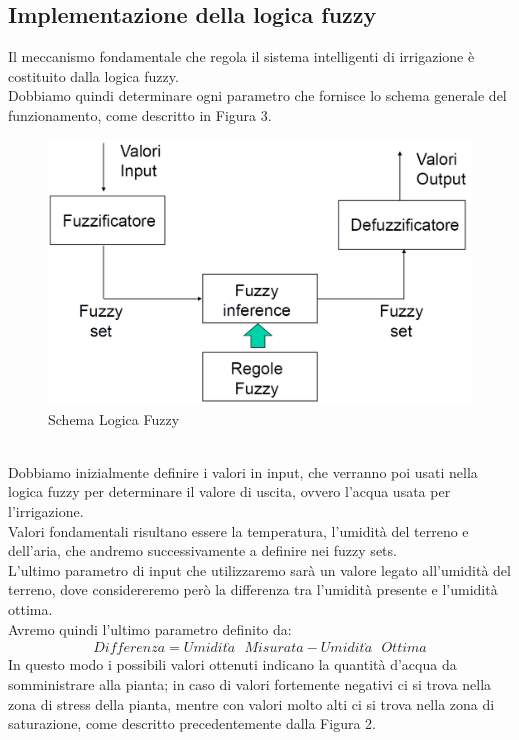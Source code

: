 \documentclass[conference,10pt]{IEEEtran}
\begin{document}
\subsection{Implementazione della logica fuzzy}\label{sec:symo}
Il meccanismo fondamentale che regola il sistema intelligenti di irrigazione è costituito dalla logica fuzzy.\\
Dobbiamo quindi determinare ogni parametro che fornisce lo schema generale del funzionamento, come descritto in Figura 3.
\begin{figure}[ht]
	\centering
	\includegraphics[width=0.8\linewidth]{images/schemafuzzy.png}
	\caption{Schema Logica Fuzzy}
	\label{fig:MAD}
\end{figure}
\\Dobbiamo inizialmente definire i valori in input, che verranno poi usati nella logica fuzzy per determinare il valore di uscita, ovvero l'acqua usata per l'irrigazione.\\
Valori fondamentali risultano essere la temperatura, l'umidità del terreno e dell'aria, che andremo successivamente a definire nei fuzzy sets.\\
L'ultimo parametro di input che utilizzaremo sarà un valore legato all'umidità del terreno, dove considereremo però la differenza tra l'umidità presente e l'umidità ottima. \\Avremo quindi l'ultimo parametro definito da:\\
\begin{equation*}
\begin{split}
Differenza = Umidit\grave{a}\text{ }Misurata-Umidit\grave{a}\text{ }Ottima
\end{split}
\end{equation*}  
In questo modo i possibili valori ottenuti indicano la quantità d'acqua da somministrare alla pianta; in caso di valori fortemente negativi ci si trova nella zona di stress della pianta, mentre con valori molto alti ci si trova nella zona di saturazione, come descritto precedentemente dalla Figura 2.\\
\end{document}
